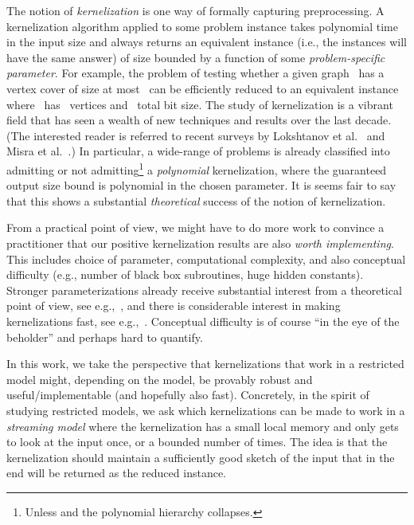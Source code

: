 \documentclass[draft,a4paper]{llncs}
\begin{document}
The notion of \emph{kernelization} is one way of formally capturing preprocessing. A kernelization algorithm applied to some problem instance takes polynomial time in the input size and always returns an equivalent instance (i.e., the instances will have the same answer) of size bounded by a function of some \emph{problem-specific parameter}. For example, the problem of testing whether a given graph~ has a vertex cover of size at most~ can be efficiently reduced to an equivalent instance~ where~ has~ vertices and~ total bit size. The study of kernelization is a vibrant field that has seen a wealth of new techniques and results over the last decade. (The interested reader is referred to recent surveys by Lokshtanov et al.~\cite{LokshtanovMS12} and Misra et al.~\cite{MisraRS11}.) In particular, a wide-range of problems is already classified into admitting or not admitting\footnote{Unless  and the polynomial hierarchy collapses.} a \emph{
polynomial} kernelization, where the guaranteed output size bound is polynomial in the chosen parameter.
It is seems fair to say that this shows a substantial \emph{theoretical} success of the notion of kernelization.

From a practical point of view, we might have to do more work to convince a practitioner that our positive kernelization results are also \emph{worth implementing}. This includes choice of parameter, computational complexity, and also conceptual difficulty (e.g., number of black box subroutines, huge hidden constants). Stronger parameterizations already receive substantial interest from a theoretical point of view, see e.g.,~\cite{DBLP:journals/ejc/FellowsJR13}, and there is considerable interest in making kernelizations fast, see e.g.,~\cite{BevernHKNW11,Hagerup11,Bevern12,Kammer13}. Conceptual difficulty is of course ``in the eye of the beholder'' and perhaps hard to quantify.

In this work, we take the perspective that kernelizations that work in a restricted model might, depending on the model, be provably robust and useful/implementable (and hopefully also fast). Concretely, in the spirit of studying restricted models, we ask which kernelizations can be made to work in a \emph{streaming model} where the kernelization has a small local memory and only gets to look at the input once, or a bounded number of times. The idea is that the kernelization should maintain a sufficiently good sketch of the input that in the end will be returned as the reduced instance.
\end{document}
